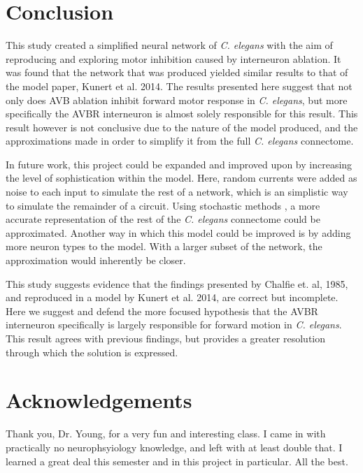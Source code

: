 \documentclass[11pt]{article} %
\begin{document}
\section{Conclusion}
This study created a simplified neural network of \emph{C. elegans} with the aim of reproducing and exploring motor inhibition caused by interneuron ablation. It was found that the network that was produced yielded similar results to that of the model paper, Kunert et al. 2014. The results presented here suggest that not only does AVB ablation inhibit forward motor response in \emph{C. elegans}, but more specifically the AVBR interneuron is almost solely responsible for this result. This result however is not conclusive due to the nature of the model produced, and the approximations made in order to simplify it from the full \emph{C. elegans} connectome.

In future work, this project could be expanded and improved upon by increasing the level of sophistication within the model. Here, random currents were added as noise to each input to simulate the rest of a network, which is an simplistic way to simulate the remainder of a circuit. Using stochastic methods \cite{Iwasaki2006}, a more accurate representation of the rest of the \emph{C. elegans} connectome could be approximated. Another way in which this model could be improved is by adding more neuron types to the model. With a larger subset of the network, the approximation would inherently be closer.

This study suggests evidence that the findings presented by Chalfie et. al, 1985, and reproduced in a model by Kunert et al. 2014, are correct but incomplete. Here we suggest and defend the more focused hypothesis that the AVBR interneuron specifically is largely responsible for forward motion in \emph{C. elegans}. This result agrees with previous findings, but provides a greater resolution through which the solution is expressed.

\section{Acknowledgements}
Thank you, Dr. Young, for a very fun and interesting class. I came in with practically no neurophsyiology knowledge, and left with at least double that. I learned a great deal this semester and in this project in particular. All the best.
\clearpage
{}

\end{document}
